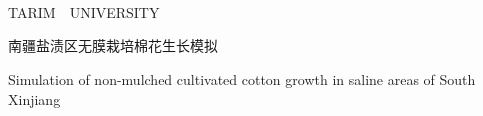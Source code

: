 \begin{titlepage}
    \begin{spacing}{1.1}
        \noindent
        \\
        \\
    \end{spacing}
    \vspace*{30pt}
    \begin{center}
        {}\\
        \vspace*{26pt}
        {TARIM\quad\ \ UNIVERSITY}
        \vspace*{58pt}

        \vspace*{36pt}

        {\heiti{}南疆盐渍区无膜栽培棉花生长模拟}
        \vspace*{3pt}

        {Simulation of non-mulched cultivated cotton growth in saline areas of South Xinjiang}


\end{center}
\end{titlepage}
